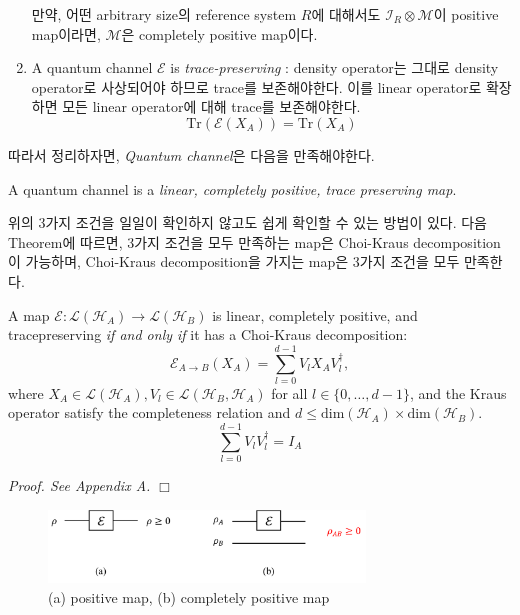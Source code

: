 \begin{enumerate}
\begin{definition}
        만약, 어떤 arbitrary size의 reference system $R$에 대해서도 $\mathcal{I}_R \otimes \mathcal{M}$이 positive map이라면, $\mathcal{M}$은 completely positive map이다.
    \end{definition}
    \item A quantum channel $\mathcal E$ is \textit{trace-preserving} : density operator는 그대로 density operator로 사상되어야 하므로 trace를 보존해야한다. 이를 linear operator로 확장하면 모든 linear operator에 대해 trace를 보존해야한다.
    \begin{equation*}
        \text{Tr}\left(\mathcal E\left(X_A\right)\right) = \text{Tr}\left(X_A\right)
    \end{equation*}
\end{enumerate}

따라서 정리하자면, \textit{Quantum channel}은 다음을 만족해야한다. 
\begin{definition}
    A quantum channel is a \textit{linear, completely positive, trace preserving map}.
\end{definition}

\vspace{0.6em}

위의 3가지 조건을 일일이 확인하지 않고도 쉽게 확인할 수 있는 방법이 있다. 다음 Theorem에 따르면, 3가지 조건을 모두 만족하는 map은 Choi-Kraus decomposition이 가능하며, Choi-Kraus decomposition을 가지는 map은 3가지 조건을 모두 만족한다.
\begin{theorem}\label{thm:Choi-Kraus}
    A map $\mathcal{E}: \mathcal{L}\left(\mathcal{H}_A\right) \rightarrow \mathcal{L}\left(\mathcal{H}_B\right)$ is linear, completely positive, and tracepreserving \textit{if and only if} it has a Choi-Kraus decomposition:
    $$ \mathcal{E}_{A \rightarrow B}\left(X_A\right)=\sum_{l=0}^{d-1} V_l X_A V_l^{\dagger}, $$
    where $X_A \in \mathcal{L}\left(\mathcal{H}_A\right), V_l \in \mathcal{L}\left(\mathcal{H}_B, \mathcal{H}_A\right)$ for all $l \in\{0, \ldots, d-1\}$,
    and the Kraus operator satisfy the completeness relation and $d \le \text{dim}\left(\mathcal{H}_A\right) \times \text{dim}\left(\mathcal{H}_B\right)$.
    $$\sum_{l=0}^{d-1} V_l V_l^{\dagger}=I_A$$
\end{theorem}
\textit{Proof. See Appendix A.} $\Box$

\begin{figure}[h]
    \centering
    \vspace{0.5em}
    \includegraphics[width=0.75\textwidth]{figures/positive.pdf}
    \caption{(a) positive map, (b) completely positive map}
    \label{fig:positive}
\end{figure}

